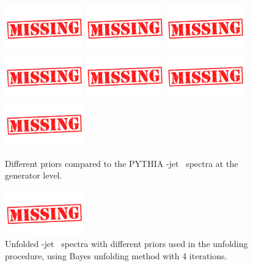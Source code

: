 \begin{figure}[bth]
\centering
\includegraphics[width=0.3\textwidth]{missing}
\includegraphics[width=0.3\textwidth]{missing}
\includegraphics[width=0.3\textwidth]{missing}
\includegraphics[width=0.3\textwidth]{missing}
\includegraphics[width=0.3\textwidth]{missing}
\includegraphics[width=0.3\textwidth]{missing}
\includegraphics[width=0.3\textwidth]{missing}
\caption{Different priors compared to the PYTHIA \Dzero-jet \pt\ spectra at the generator level.}
\label{fig:UnfSpec_pPb_Dzero_priors_all}
\end{figure}

\begin{figure}[bth]
\centering
\includegraphics[width=0.3\textwidth]{missing}
\caption{Unfolded \Dzero-jet \pt\ spectra with different priors used in the unfolding procedure, using Bayes unfolding method with 4 iterations.}
\label{fig:UnfSpec_pPb_Dzero_priors}
\end{figure}


